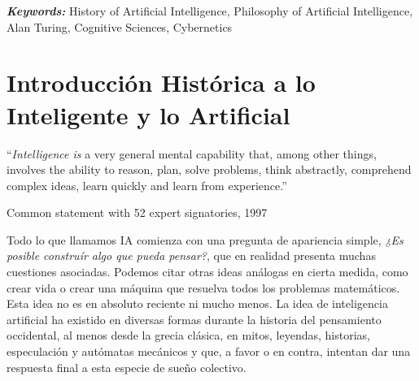 \documentclass[12pt]{memoir}
\providecommand{\keywords}[2]{
	\textbf{\textit{#1: }} #2
}
\begin{document}
\begin{otherlanguage}{english}
\begin{abstract}
\end{abstract}
\end{otherlanguage}

\keywords{Keywords}{History of Artificial Intelligence, Philosophy of Artificial Intelligence, Alan Turing, Cognitive Sciences, Cybernetics}

\newpage
\thispagestyle{empty}


\DoubleSpacing



\begin{KeepFromToc}
  \tableofcontents
\end{KeepFromToc}
\thispagestyle{empty}
\newpage

\pagestyle{fancy}
\fancyhf{}
\lhead[]{\thepage}
\rhead[\thepage]{}

\chapter{Introducción Histórica a lo Inteligente y lo Artificial}

\epigraph{``\textit{Intelligence is} a very general mental capability that, among other things, involves the ability to reason, plan, solve problems, think abstractly, comprehend complex ideas, learn quickly and learn from experience.''}{Common statement with 52 expert signatories, 1997}

Todo lo que llamamos IA comienza con una pregunta de apariencia simple, \textit{¿Es posible construír algo que pueda pensar?}, que en realidad presenta muchas cuestiones asociadas. Podemos citar otras ideas análogas en cierta medida, como crear vida o crear una máquina que resuelva todos los problemas matemáticos. Esta idea no es en absoluto reciente ni mucho menos. La idea de inteligencia artificial ha existido en diversas formas durante la historia del pensamiento occidental, al menos desde la grecia clásica, en mitos, leyendas, historias, especulación y autómatas mecánicos y que, a favor o en contra, intentan dar una respuesta final a esta especie de sueño colectivo.
\end{document}
